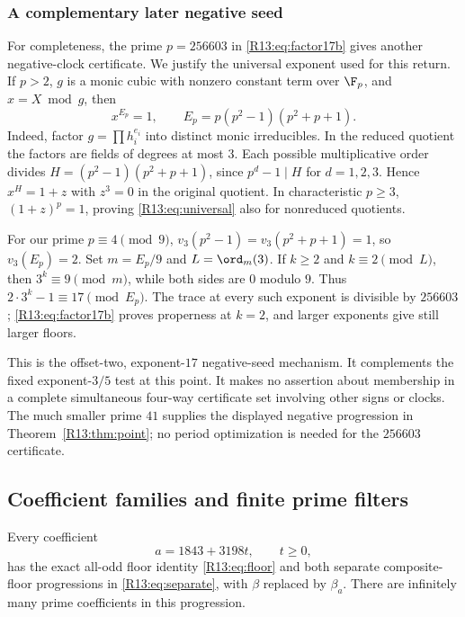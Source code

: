 \documentclass[11pt,a4paper]{article}
\theoremstyle{definition}\newtheorem{definition}[theorem]{Definition}
\theoremstyle{remark}\newtheorem{remark}[theorem]{Remark}
\begin{document}
\subsubsection{A complementary later negative seed}

For completeness, the prime $p=256603$ in \eqref{R13:eq:factor17b}
gives another negative-clock certificate.
We justify the universal exponent used for this return.
If $p>2$, $g$ is a monic cubic with nonzero constant term over $\F_p$,
and $x=X\bmod g$, then
\begin{equation}\label{R13:eq:universal}
 x^{E_p}=1,\qquad E_p=p(p^2-1)(p^2+p+1).
\end{equation}
Indeed, factor $g=\prod h_i^{e_i}$ into distinct monic irreducibles.
In the reduced quotient the factors are fields of degrees at most $3$.
Each possible multiplicative order divides
$H=(p^2-1)(p^2+p+1)$, since $p^d-1\mid H$ for $d=1,2,3$.
Hence $x^H=1+z$ with $z^3=0$ in the original quotient.
In characteristic $p\ge3$, $(1+z)^p=1$, proving \eqref{R13:eq:universal}
also for nonreduced quotients.

For our prime $p\equiv4\pmod9$,
$v_3(p^2-1)=v_3(p^2+p+1)=1$, so $v_3(E_p)=2$.
Set $m=E_p/9$ and $L=\ord_m(3)$.
If $k\ge2$ and $k\equiv2\pmod L$, then
$3^k\equiv9\pmod m$, while both sides are $0$ modulo $9$.
Thus $2\cdot3^k-1\equiv17\pmod{E_p}$.
The trace at every such exponent is divisible by $256603$;
\eqref{R13:eq:factor17b} proves properness at $k=2$, and larger
exponents give still larger floors.

This is the offset-two, exponent-$17$ negative-seed mechanism.
It complements the fixed exponent-$3/5$ test at this point.
It makes no assertion about membership in a complete simultaneous
four-way certificate set involving other signs or clocks.
The much smaller prime $41$ supplies the displayed negative
progression in Theorem~\ref{R13:thm:point}; no period optimization
is needed for the $256603$ certificate.

\subsection{Coefficient families and finite prime filters}

\begin{proposition}\label{R13:prop:AP}
Every coefficient
\begin{equation}\label{R13:eq:coefficientAP}
 a=1843+3198t,\qquad t\ge0,
\end{equation}
has the exact all-odd floor identity \eqref{R13:eq:floor} and both
separate composite-floor progressions in \eqref{R13:eq:separate}, with
$\beta$ replaced by $\beta_a$.
There are infinitely many prime coefficients in this progression.
\end{proposition}
\end{document}
